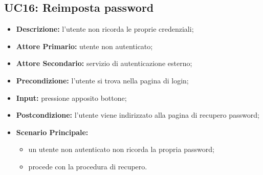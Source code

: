 \subsection{UC16: Reimposta password}
\label{sec:UC16}
\begin{itemize}
    \item \textbf{Descrizione:} l'utente non ricorda le proprie credenziali;
    \item \textbf{Attore Primario:} utente non autenticato;
    \item \textbf{Attore Secondario:} servizio di autenticazione esterno;
    \item \textbf{Precondizione:} l'utente si trova nella pagina di login;
    \item \textbf{Input:} pressione apposito bottone;
    \item \textbf{Postcondizione:} l'utente viene indirizzato alla pagina di recupero password;
    \item \textbf{Scenario Principale:}
          \begin{itemize}
              \item un utente non autenticato non ricorda la propria password;
              \item procede con la procedura di recupero.
          \end{itemize}
\end{itemize}